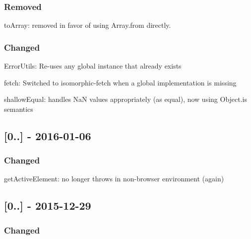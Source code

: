 \subsubsection*{Removed}


\begin{DoxyItemize}
\item {\ttfamily to\+Array}\+: removed in favor of using {\ttfamily Array.\+from} directly.
\end{DoxyItemize}

\subsubsection*{Changed}


\begin{DoxyItemize}
\item {\ttfamily Error\+Utils}\+: Re-\/uses any global instance that already exists
\item {\ttfamily fetch}\+: Switched to {\ttfamily isomorphic-\/fetch} when a global implementation is missing
\item {\ttfamily shallow\+Equal}\+: handles {\ttfamily NaN} values appropriately (as equal), now using {\ttfamily Object.\+is} semantics
\end{DoxyItemize}

\subsection*{\mbox{[}0..\mbox{]} -\/ 2016-\/01-\/06}

\subsubsection*{Changed}


\begin{DoxyItemize}
\item {\ttfamily get\+Active\+Element}\+: no longer throws in non-\/browser environment (again)
\end{DoxyItemize}

\subsection*{\mbox{[}0..\mbox{]} -\/ 2015-\/12-\/29}

\subsubsection*{Changed}


